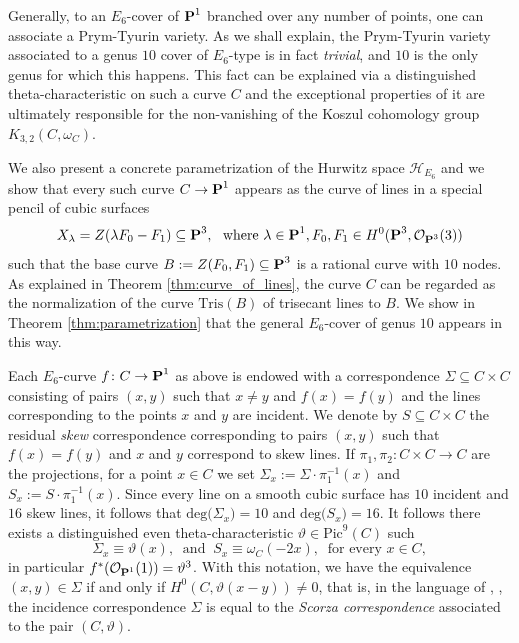 \documentclass[11pt]{amsart}
\theoremstyle{definition}
\def\PP{{\textbf P}}
\def\OO{\mathcal{O}}
\def\cH{\mathcal{H}}
\begin{document}
\vskip 4pt

Generally, to an $E_6$-cover of $\PP^1$ branched over any number of points, one can associate a Prym-Tyurin variety.  As we shall explain, the Prym-Tyurin variety associated to a genus $10$ cover of $E_6$-type is in fact \emph{trivial}, and $10$ is the only genus for which this happens. This fact can be explained via a distinguished theta-characteristic on such a curve $C$ and the exceptional properties of it are ultimately responsible for the non-vanishing of the Koszul cohomology group $K_{3,2}(C, \omega_C)$. 

\vskip 4pt

We also present a concrete parametrization of the Hurwitz space $\cH_{E_6}$ and we show that every such curve $C\rightarrow \PP^1$ appears as the curve of lines in a special pencil of cubic surfaces 
$$X_{\lambda}=Z(\lambda F_0-F_1)\subseteq \PP^3, \ \mbox{ where } \lambda\in \PP^1, F_0, F_1\in H^0(\PP^3, \OO_{\PP^3}(3))$$
such that the base curve $B:=Z(F_0, F_1)\subseteq \PP^3$ is a rational curve with $10$ nodes. As explained in Theorem \ref{thm:curve_of_lines}, the curve $C$ can be regarded as the normalization of the curve $\mathrm{Tris}(B)$ of trisecant lines to $B$. We show in Theorem \ref{thm:parametrization} that the general $E_6$-cover of genus $10$ appears in this way. 

\vskip 4pt

Each $E_6$-curve $f\colon C\rightarrow \PP^1$ as above is endowed with a correspondence $\Sigma\subseteq C\times C$ consisting of pairs $(x,y)$ such that $x\neq y$ and  $f(x)=f(y)$ and the lines corresponding to the points $x$ and $y$ are incident. We denote by $S\subseteq C\times C$ the residual \emph{skew} correspondence corresponding to pairs $(x,y)$ such that  $f(x)=f(y)$ and $x$ and $y$ correspond to skew lines. If $\pi_1, \pi_2\colon C\times C\rightarrow C$ are the projections, for a point $x\in C$ we set $\Sigma_x:=\Sigma\cdot \pi_1^{-1}(x)$ and $S_x:=S\cdot \pi_1^{-1}(x)$. Since every line on a smooth cubic surface has $10$ incident and $16$ skew lines, it follows that $\mbox{deg}\bigl(\Sigma_x\bigr)=10$ and $\mbox{deg}\bigl(S_x\bigr)=16$.  It follows there exists a distinguished even theta-characteristic $\vartheta \in \mbox{Pic}^9(C)$ such 
$$\Sigma_x\equiv \vartheta(x), \ \mbox{ and } \ S_x\equiv \omega_C(-2x), \ \mbox{ for every }x\in C,$$
in particular $f^*(\OO_{\PP^1}(1))=\vartheta^{3}$. With this notation, we have the equivalence $(x,y)\in \Sigma$ if and only if $H^0(C,\vartheta(x-y))\neq 0$, that is, in the language of \cite{DK}, \cite{FI}, the incidence correspondence $\Sigma$ is equal to the \emph{Scorza correspondence} associated to the pair $(C,\vartheta)$. 
\end{document}
